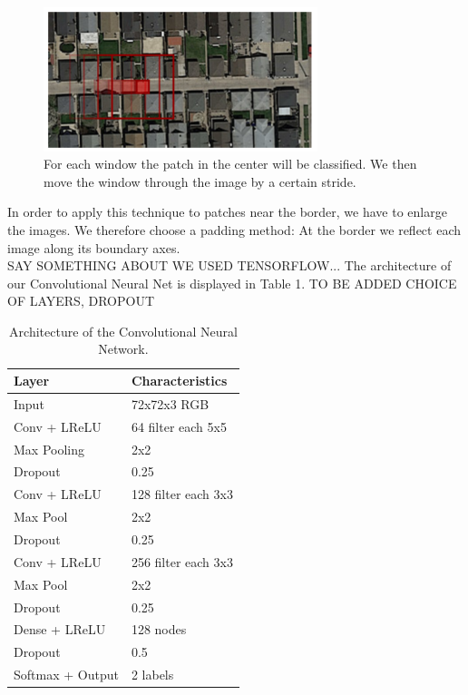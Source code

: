 \documentclass[10pt,conference,compsocconf]{IEEEtran}
\begin{document}
\begin{figure}[htbp]
	\centering
	\includegraphics[width=8cm]{images/slidingwindow.png}
	\caption{For each window the patch in the center will be classified. We then move the window through the image by a certain stride.}
	\vspace{-3mm}
	\label{fig:slidwindo}
\end{figure}

In order to apply this technique to patches near the border, we have to enlarge the images. We therefore choose a padding method: At the border we reflect each image along its boundary axes.
\\

SAY SOMETHING ABOUT WE USED TENSORFLOW...
The architecture of our Convolutional Neural Net is displayed in Table 1. 
TO BE ADDED CHOICE OF LAYERS, DROPOUT

\begin{table}[htbp]
	\centering
	\begin{tabular}[c]{|l||l|}
		\hline
		\textbf{Layer}&\textbf{Characteristics}\\
		\hline
		Input&72x72x3 RGB\\
		Conv + LReLU &64 filter each 5x5\\
		Max Pooling&2x2\\		
		Dropout&0.25\\
		\hline
		Conv + LReLU &128 filter each 3x3\\
		Max Pool&2x2\\		
		Dropout&0.25\\
		\hline
		Conv + LReLU &256 filter each 3x3\\
		Max Pool&2x2\\		
		Dropout&0.25\\
		\hline
		Dense + LReLU &128 nodes\\
		Dropout&0.5\\		
		Softmax + Output&2 labels\\
		\hline
	\end{tabular}
	\caption{Architecture of the Convolutional Neural Network.}
	\label{tab:cnn_architecture}
\end{table}
\end{document}
